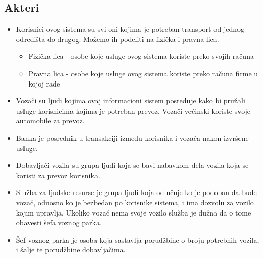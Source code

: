 \subsection{\bfseries Akteri}
\begin{itemize}
    \item Korisnici ovog sistema su svi oni kojima je potreban transport od jednog odredišta do drugog. Možemo ih podeliti na fizička i pravna lica. 
    \begin{itemize}
        \item Fizička lica - osobe koje usluge ovog sistema koriste preko svojih računa
        \item Pravna lica - osobe koje usluge ovog sistema koriste preko računa firme u kojoj rade
    \end{itemize}
    \item Vozači su ljudi kojima ovaj informacioni sistem posreduje kako bi pružali usluge korisnicima kojima je potreban prevoz. Vozači većinski koriste svoje automobile za prevoz.
    \item Banka je posrednik u transakciji između korisnika i vozača nakon izvršene usluge.
    \item Dobavljači vozila su grupa ljudi koja se bavi nabavkom dela vozila koja se koristi za prevoz korisnika.
    \item Služba za ljudske resurse je grupa ljudi koja odlučuje ko je podoban da bude vozač, odnosno ko je bezbedan po korisnike sistema, i ima dozvolu za vozilo kojim upravlja. Ukoliko vozač nema svoje vozilo služba je dužna da o tome obavesti šefa voznog parka.
     \item Šef voznog parka je osoba koja sastavlja porudžbine o broju potrebnih vozila, i šalje te porudžbine dobavljačima.
\end{itemize}
